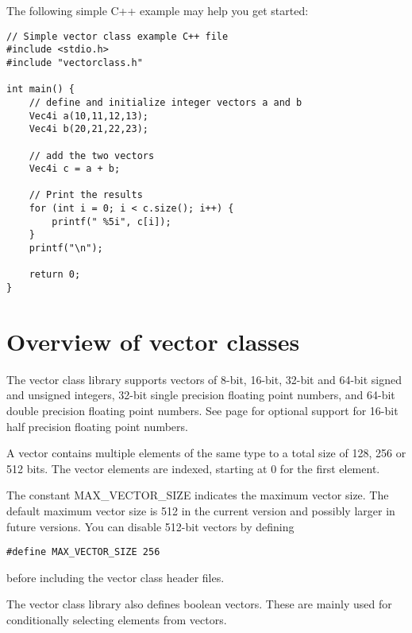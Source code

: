 \documentclass[vcl_manual.tex]{subfiles}
\begin{document}

The following simple C++ example may help you get started:

\begin{example}
\label{exampleArrayLoop3}
\end{example} 
\begin{lstlisting}[frame=single]
// Simple vector class example C++ file
#include <stdio.h>
#include "vectorclass.h"

int main() {
    // define and initialize integer vectors a and b
    Vec4i a(10,11,12,13);
    Vec4i b(20,21,22,23);

    // add the two vectors
    Vec4i c = a + b;

    // Print the results
    for (int i = 0; i < c.size(); i++) {
        printf(" %5i", c[i]);
    }
    printf("\n");

    return 0;
}
\end{lstlisting}

\section{Overview of vector classes} \label{OverviewOfVectorClasses}
The vector class library supports vectors of 8-bit, 16-bit, 32-bit and 64-bit signed and unsigned integers, 32-bit single precision floating point numbers, and 64-bit double precision floating point numbers. See page \pageref{HalfPrecision} for optional support for 16-bit half precision floating point numbers. 

A vector contains multiple elements of the same type to a total size of 128, 256 or 512 bits. The vector elements are indexed, starting at 0 for the first element.

The constant MAX\_VECTOR\_SIZE indicates the maximum vector size. The default maximum vector size is 512 in the current version and possibly larger in future versions. You can disable 512-bit vectors by defining
\begin{lstlisting}[frame=none]
    #define MAX_VECTOR_SIZE 256
\end{lstlisting}
before including the vector class header files.

The vector class library also defines boolean vectors. These are mainly used for conditionally selecting elements from vectors.
\end{document}
